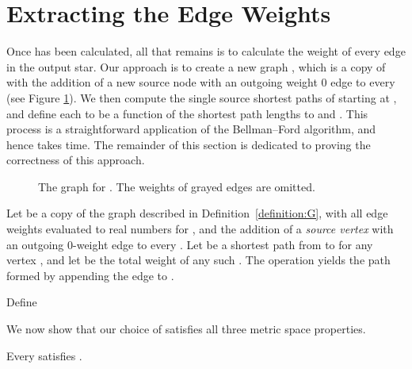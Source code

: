 \documentclass{llncs}
\def \figurescale {.85}
\begin{document}

\section{Extracting the Edge Weights}
\label{section:extracting_weights}

Once  has been calculated, all that remains is to calculate the weight of every edge in the output star.  Our approach is to create a new graph , which is a copy of  with the addition of a new source node  with an outgoing weight 0 edge to every  (see Figure \ref{figure:G_prime}).  We then compute the single source shortest paths of  starting at , and define each  to be a function of the shortest path lengths to  and .  This process is a straightforward application of the Bellman--Ford algorithm, and hence takes  time.  The remainder of this section is dedicated to proving the correctness of this approach.

\begin{figure}
\centering
\scalebox{\figurescale}{\texttt{[image: G\_prime.eps]}}
\caption{The graph  for .  The weights of grayed edges are omitted.}
\label{figure:G_prime}
\end{figure}


\begin{definition}
Let  be a copy of the graph  described in Definition~\ref{definition:G}, with all edge weights evaluated to real numbers for , and the addition of a \emph{source vertex}  with an outgoing 0-weight edge to every .  Let  be a shortest path from  to  for any vertex , and let  be the total weight of any such .  The operation  yields the path formed by appending the edge  to .
\end{definition}

\begin{definition}
Define 
\end{definition}

We now show that our choice of  satisfies all three metric space properties.

\begin{lemma}
Every  satisfies .
\end{lemma}

\end{document}
